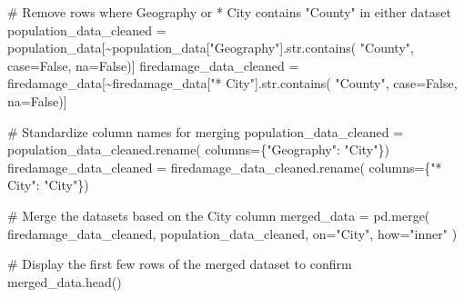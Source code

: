\documentclass[
  letterpaper,
  DIV=11,
  numbers=noendperiod]{scrartcl}
\newenvironment{Shaded}{\begin{snugshade}}{\end{snugshade}}
\newcommand{\BuiltInTok}[1]{\textcolor[rgb]{0.00,0.23,0.31}{#1}}
\newcommand{\CommentTok}[1]{\textcolor[rgb]{0.37,0.37,0.37}{#1}}
\newcommand{\NormalTok}[1]{\textcolor[rgb]{0.00,0.23,0.31}{#1}}
\newcommand{\OperatorTok}[1]{\textcolor[rgb]{0.37,0.37,0.37}{#1}}
\newcommand{\StringTok}[1]{\textcolor[rgb]{0.13,0.47,0.30}{#1}}
\newcommand{\VariableTok}[1]{\textcolor[rgb]{0.07,0.07,0.07}{#1}}
\begin{document}
\begin{Shaded}
\begin{Highlighting}[]
\CommentTok{\# Remove rows where Geography or * City contains "County" in either dataset}
\NormalTok{population\_data\_cleaned }\OperatorTok{=}\NormalTok{ population\_data[}\OperatorTok{\textasciitilde{}}\NormalTok{population\_data[}\StringTok{"Geography"}\NormalTok{].}\BuiltInTok{str}\NormalTok{.contains(}
    \StringTok{"County"}\NormalTok{, case}\OperatorTok{=}\VariableTok{False}\NormalTok{, na}\OperatorTok{=}\VariableTok{False}\NormalTok{)]}
\NormalTok{firedamage\_data\_cleaned }\OperatorTok{=}\NormalTok{ firedamage\_data[}\OperatorTok{\textasciitilde{}}\NormalTok{firedamage\_data[}\StringTok{"* City"}\NormalTok{].}\BuiltInTok{str}\NormalTok{.contains(}
    \StringTok{"County"}\NormalTok{, case}\OperatorTok{=}\VariableTok{False}\NormalTok{, na}\OperatorTok{=}\VariableTok{False}\NormalTok{)]}

\CommentTok{\# Standardize column names for merging}
\NormalTok{population\_data\_cleaned }\OperatorTok{=}\NormalTok{ population\_data\_cleaned.rename(}
\NormalTok{    columns}\OperatorTok{=}\NormalTok{\{}\StringTok{"Geography"}\NormalTok{: }\StringTok{"City"}\NormalTok{\})}
\NormalTok{firedamage\_data\_cleaned }\OperatorTok{=}\NormalTok{ firedamage\_data\_cleaned.rename(}
\NormalTok{    columns}\OperatorTok{=}\NormalTok{\{}\StringTok{"* City"}\NormalTok{: }\StringTok{"City"}\NormalTok{\})}

\CommentTok{\# Merge the datasets based on the City column}
\NormalTok{merged\_data }\OperatorTok{=}\NormalTok{ pd.merge(}
\NormalTok{    firedamage\_data\_cleaned,}
\NormalTok{    population\_data\_cleaned,}
\NormalTok{    on}\OperatorTok{=}\StringTok{"City"}\NormalTok{,}
\NormalTok{    how}\OperatorTok{=}\StringTok{"inner"}
\NormalTok{)}

\CommentTok{\# Display the first few rows of the merged dataset to confirm}
\NormalTok{merged\_data.head()}
\end{Highlighting}
\end{Shaded}
\end{document}
